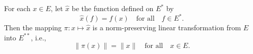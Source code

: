 For each $x \in E$, let $\hat{x}$ be the function defined on $E^*$ by
$$\hat{x}(f) = f(x) \quad \text{for all} \quad f \in E^*.$$
Then the mapping $\pi: x \mapsto \hat{x}$ is a norm-preserving linear transformation from $E$ into $E^{**}$, i.e.,
$$\|\pi(x)\| = \|x\| \quad \text{for all} \quad x \in E.$$

